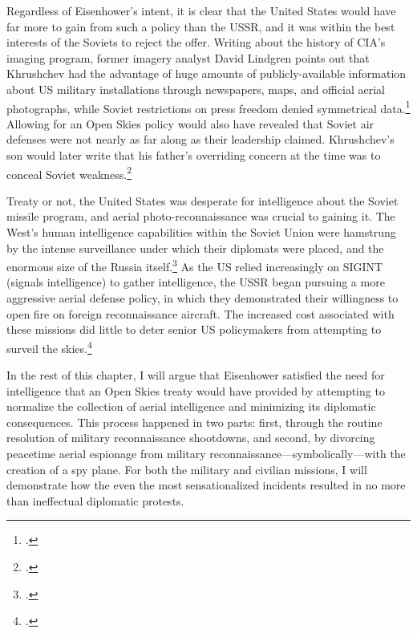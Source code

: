 \documentclass{report}
\begin{document}
\begin{refsegment}

Regardless of Eisenhower's intent, it is clear that the United States would have far more to gain from such a policy than the USSR, and it was within the best interests of the Soviets to reject the offer. Writing about the history of CIA's imaging program, former imagery analyst David Lindgren points out that Khrushchev had the advantage of huge amounts of publicly-available information about US military installations through newspapers, maps, and official aerial photographs, while Soviet restrictions on press freedom denied symmetrical data.\footcite[p.~38]{lindgren_trust_2000} Allowing for an Open Skies policy would also have revealed that Soviet air defenses were not nearly as far along as their leadership claimed. Khrushchev's son would later write that his father's overriding concern at the time was to conceal Soviet weakness.\footcite[p.~133]{brugioni_eyes_2010}

Treaty or not, the United States was desperate for intelligence about the Soviet missile program, and aerial photo-reconnaissance was crucial to gaining it. The West's human intelligence capabilities within the Soviet Union were hamstrung by the intense surveillance under which their diplomats were placed, and the enormous size of the Russia itself.\footcite[p.~23]{lindgren_trust_2000} As the US relied increasingly on SIGINT (signals intelligence) to gather intelligence, the USSR began pursuing a more aggressive aerial defense policy, in which they demonstrated their willingness to open fire on foreign reconnaissance aircraft. The increased cost associated with these missions did little to deter senior US policymakers from attempting to surveil the skies.\footcite[p.~4]{pedlow_cia_1998}


In the rest of this chapter, I will argue that Eisenhower satisfied the need for intelligence that an Open Skies treaty would have provided by attempting to normalize the collection of aerial intelligence and minimizing its diplomatic consequences. This process happened in two parts: first, through the routine resolution of military reconnaissance shootdowns, and second, by divorcing peacetime aerial espionage from military reconnaissance---symbolically---with the creation of a spy plane. For both the military and civilian missions, I will demonstrate how the even the most sensationalized incidents resulted in no more than ineffectual diplomatic protests.


\end{refsegment}
\end{document}
